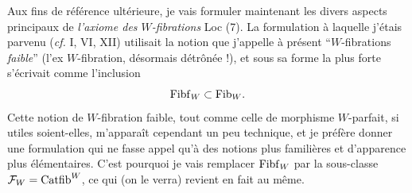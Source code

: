 Aux fins de référence ultérieure, je vais formuler maintenant les divers aspects principaux de \textit{l'axiome des $W$-fibrations} Loc (7). La formulation à laquelle j'étais parvenu (\textit{cf.} I, VI, XII) utilisait la notion que j'appelle à présent “$W$-fibrations \textit{faible}” (l'ex $W$-fibration, désormais détrônée !), et sous sa forme la plus forte s'écrivait comme l'inclusion %
\[
\mathrm{Fibf}_W \subset \mathrm{Fib}_W.
\]
Cette notion de $W$-fibration faible, tout comme celle de morphisme $W$-parfait, si utiles soient-elles, m'apparaît cependant un peu technique, et je préfère donner une formulation qui ne fasse appel qu'à des notions plus familières et d'apparence plus élémentaires. C'est pourquoi je vais remplacer $\mathrm{Fibf}_W$ par la sous-classe $\mathcal{F}_W = \mathrm{Catfib}^W$, ce qui (on le verra) revient en fait au même.


